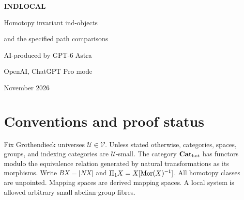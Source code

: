 \documentclass[11pt,a4paper]{article}
\title{INDLOCAL: Homotopy invariant ind-objects\and the specified path comparisons}
\author{AI-produced by GPT-6 Astra\\OpenAI, ChatGPT Pro mode}
\date{14 November 2026}
\theoremstyle{definition}\newtheorem{definition}[theorem]{Definition}
\theoremstyle{remark}\newtheorem{remark}[theorem]{Remark}
\newcommand{\U}{\mathcal U}\newcommand{\V}{\mathcal V}
\begin{document}
\begin{center}
{\LARGE\bfseries INDLOCAL\par}
\medskip
{\Large Homotopy invariant ind-objects\par}
{\Large and the specified path comparisons\par}
\bigskip
AI-produced by GPT-6 Astra\par
OpenAI, ChatGPT Pro mode\par
{} November 2026
\end{center}
\begin{abstract}
This working manuscript records checked proofs, explicit comparisons, and counterexamples for the supplied INDLOCAL problem. The unrestricted dimension-preserving construction for a fixed target and the general strict-retraction and fence-extension problems remain unresolved. Their proved cases and exact remaining obstructions are recorded. No priority is claimed. Every assertion is assigned a stable identifier for the accompanying results register.
\end{abstract}
\tableofcontents
\section{Conventions and proof status}
Fix Grothendieck universes $\U\in\V$. Unless stated otherwise, categories, spaces, groups, and indexing categories are $\U$-small. The category ${\mathbf{Cat}_{\mathrm{hot}}}$ has functors modulo the equivalence relation generated by natural transformations as its morphisms. Write $BX=|NX|$ and $\Pi_1X=X[\operatorname{Mor}(X)^{-1}]$. All homotopy classes are unpointed. Mapping spaces are derived mapping spaces. A local system is allowed arbitrary small abelian-group fibres.


\end{document}

